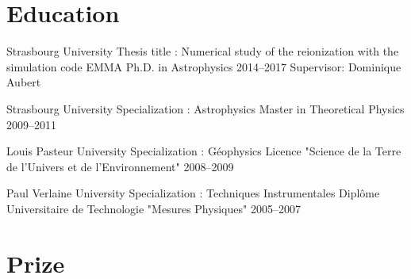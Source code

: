 \documentclass[11pt,a4paper,sans]{moderncv}
\begin{document}


\section{Education}

\cventry
{Strasbourg University}
{Thesis title : Numerical study of the reionization with the simulation code EMMA}
{Ph.D. in Astrophysics}
{2014--2017}
{}
{Supervisor: Dominique Aubert}


\cventry
{Strasbourg University}
{Specialization : Astrophysics}
{Master in Theoretical Physics}
{2009--2011}
{}
{}

\cventry
{Louis Pasteur University}
{Specialization : Géophysics}
{Licence "Science de la Terre de l'Univers et de l’Environnement"}
{2008--2009}
{}
{}


\cventry
{Paul Verlaine University}
{Specialization : Techniques Instrumentales}
{Diplôme Universitaire de Technologie "Mesures Physiques"}
{2005--2007}
{}
{}





\section{Prize}



\end{document}
